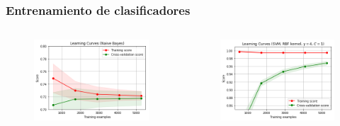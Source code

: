 \documentclass[handout]{beamer}
\begin{document}
\begin{frame}
\frametitle{Entrenamiento de clasificadores}

\begin{columns}[t] 

\begin{figure}
\includegraphics[width=\textwidth]{../figures/NB.png}
\end{figure}

\begin{figure}
\includegraphics[width=\textwidth]{../figures/SVM-RBF.png}
\end{figure}

\end{columns}


\end{frame}
\end{document}
